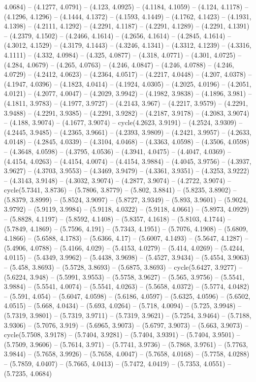 4.0684) -- (4.1277, 4.0791) -- (4.123, 4.0925) -- (4.1184, 4.1059) -- (4.124, 4.1178) -- (4.1296, 4.1296) -- (4.1444, 4.1372) -- (4.1593, 4.1449) -- (4.1762, 4.1423) -- (4.1931, 4.1398) -- (4.2111, 4.1292) -- (4.2291, 4.1187) -- (4.2291, 4.1289) -- (4.2291, 4.1391) -- (4.2379, 4.1502) -- (4.2466, 4.1614) -- (4.2656, 4.1614) -- (4.2845, 4.1614) -- (4.3012, 4.1529) -- (4.3179, 4.1443) -- (4.3246, 4.1341) -- (4.3312, 4.1239) -- (4.3316, 4.1111) -- (4.332, 4.0984) -- (4.325, 4.0877) -- (4.318, 4.0771) -- (4.301, 4.0725) -- (4.284, 4.0679) -- (4.265, 4.0763) -- (4.246, 4.0847) -- (4.246, 4.0788) -- (4.246, 4.0729) -- (4.2412, 4.0623) -- (4.2364, 4.0517) -- (4.2217, 4.0448) -- (4.207, 4.0378) -- (4.1947, 4.0396) -- (4.1823, 4.0414) -- (4.1924, 4.0305) -- (4.2025, 4.0196) -- (4.2051, 4.0121) -- (4.2077, 4.0047) -- (4.2029, 3.9942) -- (4.1982, 3.9838) -- (4.1896, 3.981) -- (4.1811, 3.9783) -- (4.1977, 3.9727) -- (4.2143, 3.967) -- (4.2217, 3.9579) -- (4.2291, 3.9488) -- (4.2291, 3.9385) -- (4.2291, 3.9282) -- (4.2187, 3.9178) -- (4.2083, 3.9074) -- (4.188, 3.9074) -- (4.1677, 3.9074) -- cycle(4.2623, 3.9191) -- (4.2524, 3.9309) -- (4.2445, 3.9485) -- (4.2365, 3.9661) -- (4.2393, 3.9809) -- (4.2421, 3.9957) -- (4.2633, 4.0148) -- (4.2845, 4.0339) -- (4.3104, 4.0468) -- (4.3363, 4.0598) -- (4.3506, 4.0598) -- (4.3648, 4.0598) -- (4.3795, 4.0536) -- (4.3941, 4.0475) -- (4.4047, 4.0369) -- (4.4154, 4.0263) -- (4.4154, 4.0074) -- (4.4154, 3.9884) -- (4.4045, 3.9756) -- (4.3937, 3.9627) -- (4.3703, 3.9553) -- (4.3469, 3.9479) -- (4.3361, 3.9351) -- (4.3253, 3.9222) -- (4.3143, 3.9148) -- (4.3032, 3.9074) -- (4.2877, 3.9074) -- (4.2722, 3.9074) -- cycle(5.7341, 3.8736) -- (5.7806, 3.8779) -- (5.802, 3.8841) -- (5.8235, 3.8902) -- (5.8379, 3.8999) -- (5.8524, 3.9097) -- (5.8727, 3.9349) -- (5.893, 3.9601) -- (5.9024, 3.9792) -- (5.9119, 3.9984) -- (5.9118, 4.0322) -- (5.9118, 4.0661) -- (5.8973, 4.0929) -- (5.8828, 4.1197) -- (5.8592, 4.1408) -- (5.8357, 4.1618) -- (5.8103, 4.1744) -- (5.7849, 4.1869) -- (5.7596, 4.191) -- (5.7343, 4.1951) -- (5.7076, 4.1908) -- (5.6809, 4.1866) -- (5.6588, 4.1783) -- (5.6366, 4.17) -- (5.6007, 4.1493) -- (5.5647, 4.1287) -- (5.4906, 4.0788) -- (5.4166, 4.029) -- (5.4153, 4.0279) -- (5.414, 4.0269) -- (5.4244, 4.0115) -- (5.4349, 3.9962) -- (5.4438, 3.9698) -- (5.4527, 3.9434) -- (5.4554, 3.9063) -- (5.458, 3.8693) -- (5.5728, 3.8693) -- (5.6875, 3.8693) -- cycle(5.6427, 3.9277) -- (5.6224, 3.948) -- (5.5991, 3.9553) -- (5.5758, 3.9627) -- (5.565, 3.9756) -- (5.5541, 3.9884) -- (5.5541, 4.0074) -- (5.5541, 4.0263) -- (5.5658, 4.0372) -- (5.5774, 4.0482) -- (5.591, 4.054) -- (5.6047, 4.0598) -- (5.6186, 4.0597) -- (5.6325, 4.0596) -- (5.6502, 4.0515) -- (5.668, 4.0434) -- (5.693, 4.0264) -- (5.718, 4.0094) -- (5.725, 3.9948) -- (5.7319, 3.9801) -- (5.7319, 3.9711) -- (5.7319, 3.9621) -- (5.7254, 3.9464) -- (5.7188, 3.9306) -- (5.7076, 3.919) -- (5.6965, 3.9073) -- (5.6797, 3.9073) -- (5.663, 3.9073) -- cycle(5.7508, 3.9178) -- (5.7404, 3.9281) -- (5.7404, 3.9391) -- (5.7404, 3.9501) -- (5.7509, 3.9606) -- (5.7614, 3.971) -- (5.7741, 3.9736) -- (5.7868, 3.9761) -- (5.7763, 3.9844) -- (5.7658, 3.9926) -- (5.7658, 4.0047) -- (5.7658, 4.0168) -- (5.7758, 4.0288) -- (5.7859, 4.0407) -- (5.7665, 4.0413) -- (5.7472, 4.0419) -- (5.7353, 4.0551) -- (5.7235, 4.0684) 